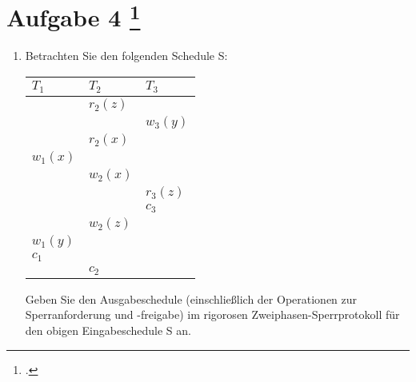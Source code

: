 \documentclass{lehramt-informatik-aufgabe}
\begin{document}
\def\l#1#2#3{$\text{#1lock}_#2(#3)$}

\liAufgabenTitel{}
\section{Aufgabe 4
\footcite{examen:66116:2020:03}}

\begin{enumerate}
\item Betrachten Sie den folgenden Schedule S:

\begin{center}
\begin{tabular}{l|l|l}
$T_1$ & $T_2$ & $T_3$ \\\hline
         & $r_2(z)$ & \\
         &          & $w_3(y)$ \\
         & $r_2(x)$ & \\
$w_1(x)$ &          & \\
         & $w_2(x)$ & \\
         &          & $r_3(z)$ \\
         &          & $c_3$ \\
         & $w_2(z)$ & \\
$w_1(y)$ &          & \\
$c_1$    &          & \\
         & $c_2$    & \\
\end{tabular}
\end{center}

Geben Sie den Ausgabeschedule (einschließlich der Operationen zur
Sperranforderung und -freigabe) im rigorosen Zweiphasen-Sperrprotokoll
für den obigen Eingabeschedule S an.


\end{enumerate}
\end{document}
